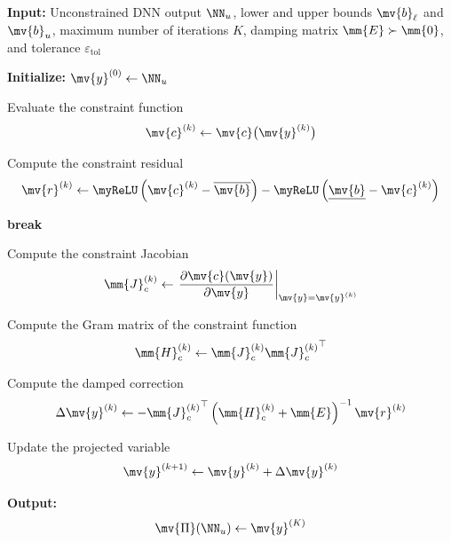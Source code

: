 \begin{algorithm}[!t]
  \caption{Differentiable Projection Layer (DPL)}
  \label{CONAC:alg:proj}
  \begin{algorithmic}[1]
    \STATE \textbf{Input:}
    Unconstrained DNN output $\NN_u$, lower and upper bounds $\mv{b}_{\ell}$ and $\mv{b}_{u}$, maximum number of iterations $K$, damping matrix $\mm{E}\succ\mm{0}$, and tolerance $\varepsilon_{\mathrm{tol}}$

    \STATE \textbf{Initialize:}
    $\mv{y}^{(0)}\leftarrow\NN_u$

      \STATE Evaluate the constraint function
      \[
        \mv{c}^{(k)}
        \leftarrow
        \mv{c}\bigl(\mv{y}^{(k)}\bigr)
      \]

      \STATE Compute the constraint residual
      \[
        \mv{r}^{(k)}
        \leftarrow
        \myReLU
        \left(\mv{c}^{(k)}-\overline{\mv{b}}\right)
        -
        \myReLU
        \left(\underline{\mv{b}}-\mv{c}^{(k)}\right)
      \]

        \STATE \textbf{break}
      \ENDIF

      \STATE Compute the constraint Jacobian
      \[
        \mm{J}_c^{(k)}
        \leftarrow
        \left.
        \frac{\partial\mv{c}(\mv{y})}
            {\partial\mv{y}}
        \right|_{\mv{y}=\mv{y}^{(k)}}
      \]

      \STATE Compute the Gram matrix of the constraint function
      \[
        \mm{H}_c^{(k)}
        \leftarrow
        \mm{J}_c^{(k)}{\mm{J}_c^{(k)}}^{\top}
      \]

      \STATE Compute the damped correction
      \[
        \Delta\mv{y}^{(k)}
        \leftarrow
        -{\mm{J}_c^{(k)}}^{\top}
        \left(
          \mm{H}_c^{(k)}
          +\mm{E}
        \right)^{-1}
        \mv{r}^{(k)}
      \]

      \STATE Update the projected variable
      \[
        \mv{y}^{(k+1)}
        \leftarrow
        \mv{y}^{(k)}+\Delta\mv{y}^{(k)}
      \]
    \ENDFOR

    \STATE \textbf{Output:}
    \[
      \mv{\Pi}(\NN_u)
      \leftarrow
      \mv{y}^{(K)}
    \]
  \end{algorithmic}
\end{algorithm}

\par\medskip

